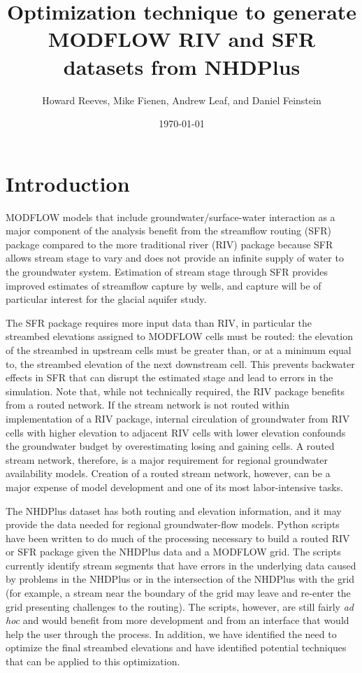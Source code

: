 \documentclass[12pt,letterpaper]{article}
\begin{document}
\textwidth 6.5in
\baselineskip 18pt

\title{Optimization technique to generate MODFLOW RIV and SFR datasets from NHDPlus}
\author{Howard  Reeves, Mike Fienen, Andrew Leaf, and Daniel Feinstein}
\date{\today}

\maketitle

\section{Introduction}
MODFLOW models that include groundwater/surface-water interaction as a major component of
the analysis benefit from the streamflow routing (SFR) package compared to the more traditional
river (RIV) package because SFR allows stream stage to vary and does not provide an infinite supply
of water to the groundwater system.  Estimation of stream stage through SFR provides improved estimates of
streamflow capture by wells, and capture will be of particular interest for the glacial aquifer
study.  

The SFR package requires more input data than RIV, in particular the streambed elevations assigned
to MODFLOW cells must be routed: the elevation of the streambed in upstream cells must be greater than, 
or at a minimum equal to, the streambed elevation of the next downstream cell.  This prevents backwater
effects in SFR that can disrupt the estimated stage and lead to errors in the simulation.  Note that,
while not technically required, the RIV package benefits from a routed network.  If the stream network is
not routed within implementation of a RIV package, internal circulation of groundwater from RIV cells with higher elevation to adjacent RIV cells with lower elevation confounds the groundwater budget by overestimating
losing and gaining cells.  A routed stream network, therefore, is a major requirement for regional 
groundwater availability models.  Creation of a routed stream network, however, can be a major expense
of model development and one of its most labor-intensive tasks.

The NHDPlus dataset has both routing and elevation information, and it may
provide the data needed for regional groundwater-flow models. Python scripts have been written to do
much of the processing necessary to build a routed RIV or SFR package given the NHDPlus
data and a MODFLOW grid.  The scripts currently identify stream segments that have errors
in the underlying data caused by problems in the NHDPlus or in the intersection of the NHDPlus
with the grid (for example, a stream near the boundary of the grid may leave and re-enter the
grid presenting challenges to the routing).  The scripts, however, are still fairly {\em ad hoc} and
would benefit from more development and from an interface that would help the user through
the process.  In addition, we have identified the need to optimize the final streambed elevations and
have identified potential techniques that can be applied to this optimization.
\end{document}
